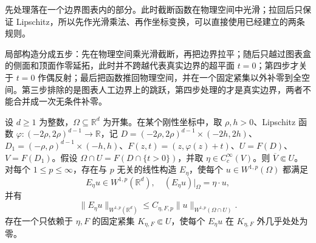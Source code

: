 先处理落在一个边界图表内的部分。此时截断函数在物理空间中光滑；拉回后只保证 Lipschitz，所以先作光滑乘法、再作坐标变换，可以直接使用已经建立的两条规则。

\ProseParagraphBreak

局部构造分成五步：先在物理空间乘光滑截断，再把边界拉平；随后只越过图表盒的侧面和顶面作零延拓，此时并不跨越代表真实边界的超平面 \(t=0\)；第四步才关于 \(t=0\) 作偶反射；最后把函数推回物理空间，并在一个固定紧集以外补零到全空间。第三步排除的是图表人工边界上的跳跃，第四步处理的才是真实边界，两者不能合并成一次无条件补零。

\begin{lemma}\label{b1:lem:localized-graph-extension}
设 \(d\geq1\) 为整数，\(\Omega\subseteq\mathbb R^d\) 为开集。在某个刚性坐标中，取 \(\rho,h>0\)、Lipschitz 函数 \(\varphi:(-2\rho,2\rho)^{d-1}\to\mathbb R\)，记 \(D=(-2\rho,2\rho)^{d-1}\times(-2h,2h)\)、\(D_1=(-\rho,\rho)^{d-1}\times(-h,h)\)、\(F(z,t)=(z,\varphi(z)+t)\)、\(U=F(D)\)、\(V=F(D_1)\)。假设 \(\Omega\cap U=F(D\cap\{t>0\})\)，并取 \(\eta\in C_c^\infty(V)\)。则 \(\overline V\Subset U\)。对每个 \(1\leq p\leq\infty\)，存在与 \(p\) 无关的线性构造 \(E_\eta\)，使每个 \(u\in W^{1,p}(\Omega)\) 都满足
\[
 E_\eta u\in W^{1,p}(\mathbb R^d),\quad
 (E_\eta u)|_\Omega=\eta\cdot u,
\]
并有
\[
 \|E_\eta u\|_{W^{1,p}(\mathbb R^d)}
 \le C_{\eta,F,p}\|u\|_{W^{1,p}(\Omega\cap U)}.
\]
存在一个只依赖于 \(\eta,F\) 的固定紧集 \(K_{\eta,F}\Subset U\)，使每个 \(E_\eta u\) 在 \(K_{\eta,F}\) 外几乎处处为零。
\end{lemma}
